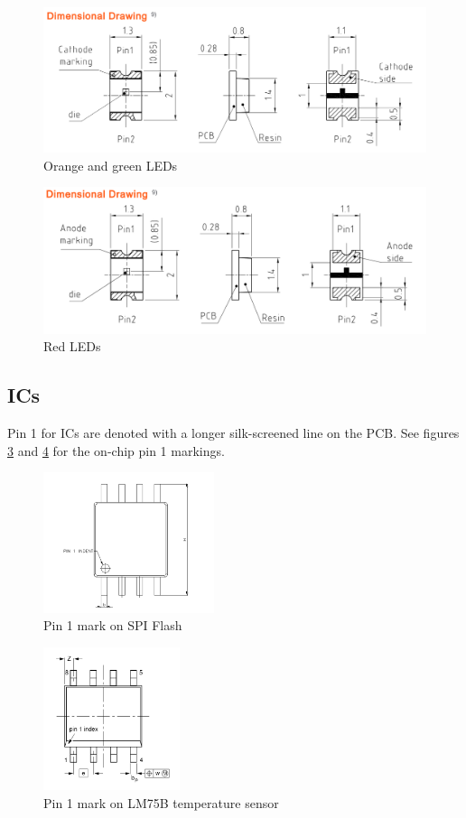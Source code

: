 \documentclass{article}
\begin{document}
\begin{figure}[H]
	\centering
	\includegraphics[width=12cm]{orange_green.png}
	\caption{Orange and green LEDs}
	\label{fig:normal}
\end{figure}
\begin{figure}[H]
	\centering
	\includegraphics[width=12cm]{red.png}
	\caption{Red LEDs}
	\label{fig:red}
\end{figure}

\subsection{ICs}
Pin 1 for ICs are denoted with a longer silk-screened line on the PCB.
See figures \ref{fig:spi} and \ref{fig:temp} for the on-chip pin 1 markings.

\begin{figure}[H]
	\centering
	\includegraphics[width=5cm]{spi_pin1.png}
	\caption{Pin 1 mark on SPI Flash}
	\label{fig:spi}
\end{figure}
\begin{figure}[H]
	\centering
	\includegraphics[width=4cm]{temp_pin1.png}
	\caption{Pin 1 mark on LM75B
		temperature sensor}
	\label{fig:temp}
\end{figure}
\end{document}
